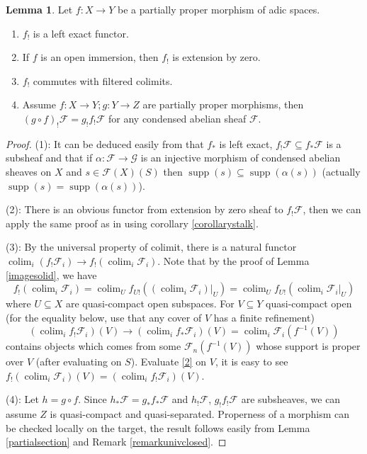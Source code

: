 \documentclass{article}
\theoremstyle{definition}
\newtheorem{lemma}[theorem]{Lemma}
\def\sF{{\mathscr{F}}}
\def\sG{{\mathscr{G}}}
\DeclareMathOperator{\colim}{colim}
\DeclareMathOperator{\supp}{supp}
\begin{document}
\begin{lemma}\label{lemmalowershriekcolimit}
Let $f:X\to Y$ be a partially proper morphism of adic spaces.
\begin{enumerate}[(1)]
	\item $f_!$ is a left exact functor.
	\item If $f$ is an open immersion, then $f_!$ is extension by zero.
	\item $f_!$ commutes with filtered colimits.
	\item Assume $f:X\to Y; g:Y\to Z$ are partially proper morphisms, then $(g\circ f)_!\sF=g_!f_!\sF$ for any condensed abelian sheaf $\sF$.
\end{enumerate}
\end{lemma}

\begin{proof}
	 (1): It can be deduced easily from that $f_*$ is left exact, $f_!\sF\subseteq f_*\sF$ is a subsheaf and that if $\alpha: \sF\to \sG$ is an injective morphism of condensed abelian sheaves on $X$ and $s\in \sF(X)(S)$ then $\supp(s)\subseteq \supp(\alpha(s))$ (actually $\supp(s) = \supp(\alpha(s))$).

	 (2): There is an obvious functor from extension by zero sheaf to $f_!\sF$, then we can apply the same proof as in \cite[Lemma 4.2]{abe2020proper} using corollary \ref{corollarystalk}.
	 	
	 (3): By the universal property of colimit, there is a natural functor $ \colim_i (f_!\sF_i)\to f_!(\colim_i \sF_i)$. Note that by the proof of Lemma \ref{imagesolid}, we have
	 \begin{equation}\label{2}
	 f_!(\colim_i \sF_i)=\colim_U f_{U!}((\colim_i \sF_i)|_U)=\colim_U f_{U!}(\colim_i \sF_i|_U)
	 \end{equation}
	  where $U\subseteq X$ are quasi-compact open subspaces. For $V\subseteq Y$ quasi-compact open (for the equality below, use that any cover of $V$ has a finite refinement)
	$$(\colim_i f_!\sF_i)(V)\longrightarrow (\colim_i f_*\sF_i)(V)=\colim_i \sF_i(f^{-1}(V))$$
	contains objects which comes from some $\sF_n(f^{-1}(V))$ whose support is proper over $V$ (after evaluating on $S$). Evaluate \eqref{2} on $V$, it is easy to see $f_!(\colim_i \sF_i)(V)=(\colim_i f_!\sF_i)(V)$.
	
	(4): Let $h=g\circ f$. Since $h_*\sF=g_* f_*\sF$ and $h_!\sF$, $g_!f_!\sF$ are subsheaves, we can assume $Z$ is quasi-compact and quasi-separated. Properness of a morphism can be checked locally on the target, the result follows easily from Lemma \ref{partialsection} and Remark \ref{remarkunivclosed}.	
	\end{proof}
	
\end{document}
